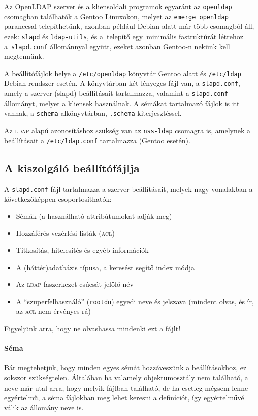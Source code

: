 Az OpenLDAP szerver és a kliensoldali programok egyaránt az \texttt{openldap} csomagban találhatók a Gentoo Linuxokon,
melyet az \texttt{emerge openldap} paranccsal telepíthetünk, azonban például Debian alatt már több csomagból áll, ezek:
\texttt{slapd} és \texttt{ldap-utils}, és a~telepítő egy~minimális fastruktúrát létrehoz a~\texttt{slapd.conf}
állománnyal együtt, ezeket azonban Gentoo-n nekünk kell megtennünk.

A beállítófájlok helye a \texttt{/etc/openldap} könyvtár Gentoo alatt és \texttt{/etc/ldap} Debian rendszer esetén. A
könyvtárban két lényeges fájl van, a \texttt{slapd.conf}, amely a szerver (slapd) beállításait tartalmazza, valamint a
\texttt{slapd.conf} állományt, melyet a kliensek használnak. A sémákat tartalmazó fájlok is itt vannak, a
\texttt{schema} alkönyvtárban, \texttt{.schema} kiterjesztéssel.

Az \textsc{ldap} alapú azonosításhoz szükség van az \texttt{nss-ldap} csomagra is, amelynek a beállításait a
\texttt{/etc/ldap.conf} tartalmazza (Gentoo esetén).

\subsection{A kiszolgáló beállítófájlja}
A \texttt{slapd.conf} fájl tartalmazza a szerver beállításait, melyek nagy vonalakban a következőképpen csoportosíthatók:

\begin{itemize}
\item Sémák (a használható attribútumokat adják meg)
\item Hozzáférés-vezérlési listák (\textsc{acl})
\item Titkosítás, hitelesítés és egyéb információk
\item A (háttér)adatbázis típusa, a keresést segítő index módja
\item Az \textsc{ldap} faszerkezet csúcsát jelölő név
\item A ``szuperfelhasználó'' (\texttt{rootdn}) egyedi neve és jelszava (mindent olvas, és ír, az \textsc{acl} nem érvényes rá)
\end{itemize}  

Figyeljünk arra, hogy ne olvashassa mindenki ezt a fájlt!

\paragraph{Séma} 
Bár megtehetjük, hogy minden egyes sémát hozzáveszünk a beállításokhoz, ez sokszor szükségtelen. Általában ha valamely
objektumosztály nem található, a neve már utal arra, hogy melyik fájlban található, de ha esetleg mégsem lenne
egyértelmű, a séma fájlokban meg lehet keresni a definíciót, így egyértelművé válik az állomány neve is.

